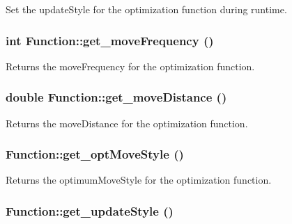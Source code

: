 Set the updateStyle for the optimization function during runtime. 

\hypertarget{classFunction_56b76e8cc2d8fc7abb79f1e0110597fb}{
\subsubsection{\setlength{\rightskip}{0pt plus 5cm}int Function::get\_\-moveFrequency ()}}
\label{classFunction_56b76e8cc2d8fc7abb79f1e0110597fb}


Returns the moveFrequency for the optimization function. 

\hypertarget{classFunction_ea2630ebec2607a174840b321597a944}{
\subsubsection{\setlength{\rightskip}{0pt plus 5cm}double Function::get\_\-moveDistance ()}}
\label{classFunction_ea2630ebec2607a174840b321597a944}


Returns the moveDistance for the optimization function. 

\hypertarget{classFunction_33fd72428c3ffe097f282d5172b6a512}{
\subsubsection{ Function::get\_\-optMoveStyle ()}}
\label{classFunction_33fd72428c3ffe097f282d5172b6a512}


Returns the optimumMoveStyle for the optimization function. 

\hypertarget{classFunction_dfeaef589691aea723b6b713763b37be}{
\subsubsection{ Function::get\_\-updateStyle ()}}
\label{classFunction_dfeaef589691aea723b6b713763b37be}


